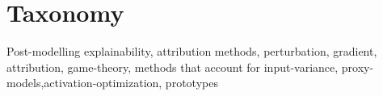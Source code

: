 \section{Taxonomy}
Post-modelling explainability, attribution methods, perturbation, gradient, attribution, game-theory, methods that account for input-variance, proxy-models,activation-optimization, prototypes
\blindtext[3]